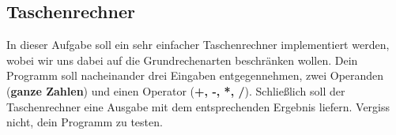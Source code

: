 \subsection{Taschenrechner}
In dieser Aufgabe soll ein sehr einfacher Taschenrechner implementiert werden, wobei wir uns dabei auf die Grundrechenarten beschränken wollen. Dein Programm soll nacheinander drei Eingaben entgegennehmen, zwei Operanden (\textbf{ganze Zahlen}) und einen Operator (\textbf{+, -, *, /}). Schließlich soll der Taschenrechner eine Ausgabe mit dem entsprechenden Ergebnis liefern. Vergiss nicht, dein Programm zu testen.
